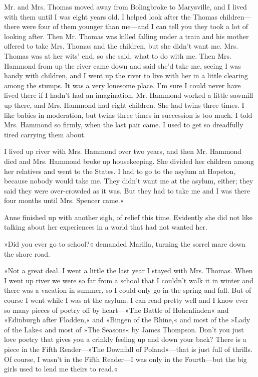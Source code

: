 Mr. and Mrs. Thomas moved away from Bolingbroke to Marysville, and I lived with them until I was eight years old. I helped look after the Thomas children—there were four of them younger than me—and I can tell you they took a lot of looking after. Then Mr. Thomas was killed falling under a train and his mother offered to take Mrs. Thomas and the children, but she didn’t want me. Mrs. Thomas was at her wits’ end, so she said, what to do with me. Then Mrs. Hammond from up the river came down and said she’d take me, seeing I was handy with children, and I went up the river to live with her in a little clearing among the stumps. It was a very lonesome place. I’m sure I could never have lived there if I hadn’t had an imagination. Mr. Hammond worked a little sawmill up there, and Mrs. Hammond had eight children. She had twins three times. I like babies in moderation, but twins three times in succession is too much. I told Mrs. Hammond so firmly, when the last pair came. I used to get so dreadfully tired carrying them about.

I lived up river with Mrs. Hammond over two years, and then Mr. Hammond died and Mrs. Hammond broke up housekeeping. She divided her children among her relatives and went to the States. I had to go to the asylum at Hopeton, because nobody would take me. They didn’t want me at the asylum, either; they said they were over-crowded as it was. But they had to take me and I was there four months until Mrs. Spencer came.«

Anne finished up with another sigh, of relief this time. Evidently she did not like talking about her experiences in a world that had not wanted her.

»Did you ever go to school?« demanded Marilla, turning the sorrel mare down the shore road.

»Not a great deal. I went a little the last year I stayed with Mrs. Thomas. When I went up river we were so far from a school that I couldn’t walk it in winter and there was a vacation in summer, so I could only go in the spring and fall. But of course I went while I was at the asylum. I can read pretty well and I know ever so many pieces of poetry off by heart—»The Battle of Hohenlinden« and »Edinburgh after Flodden,« and »Bingen of the Rhine,« and most of the »Lady of the Lake« and most of »The Seasons« by James Thompson. Don’t you just love poetry that gives you a crinkly feeling up and down your back? There is a piece in the Fifth Reader—»The Downfall of Poland«—that is just full of thrills. Of course, I wasn’t in the Fifth Reader—I was only in the Fourth—but the big girls used to lend me theirs to read.«

